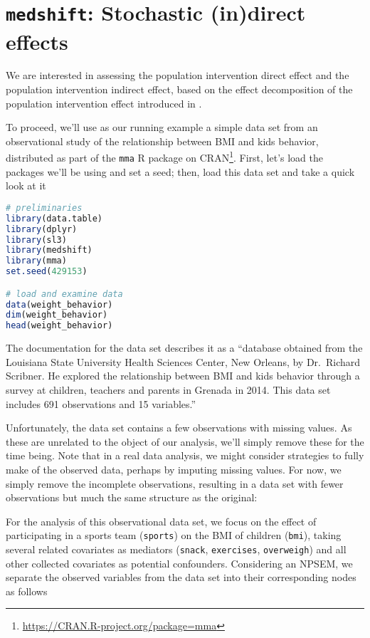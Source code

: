 \documentclass[
  12pt,
]{book}
\newcommand{\passthrough}[1]{#1}
\renewcommand{\href}[2]{#2\footnote{\url{#1}}}
\theoremstyle{definition}
\theoremstyle{definition}
\theoremstyle{definition}
\newcommand{\1}{\mathbbm{1}}
\begin{document}
\hypertarget{medshift-stochastic-indirect-effects}{%
\section{\texorpdfstring{\texttt{medshift}: Stochastic (in)direct effects}{medshift: Stochastic (in)direct effects}}\label{medshift-stochastic-indirect-effects}}

We are interested in assessing the population intervention direct effect and
the population intervention indirect effect, based on the effect decomposition
of the population intervention effect introduced in \citet{diaz2020causal}.

To proceed, we'll use as our running example a simple data set from an
observational study of the relationship between BMI and kids behavior,
distributed as part of the \href{https://CRAN.R-project.org/package=mma}{\passthrough{\lstinline!mma!} R package on
CRAN}. First, let's load the packages
we'll be using and set a seed; then, load this data set and take a quick look
at it

\begin{lstlisting}[language=R]
# preliminaries
library(data.table)
library(dplyr)
library(sl3)
library(medshift)
library(mma)
set.seed(429153)

# load and examine data
data(weight_behavior)
dim(weight_behavior)
head(weight_behavior)
\end{lstlisting}

The documentation for the data set describes it as a ``database obtained from the
Louisiana State University Health Sciences Center, New Orleans, by Dr.~Richard
Scribner. He explored the relationship between BMI and kids behavior through a
survey at children, teachers and parents in Grenada in 2014. This data set
includes 691 observations and 15 variables.''

Unfortunately, the data set contains a few observations with missing values. As
these are unrelated to the object of our analysis, we'll simply remove these for
the time being. Note that in a real data analysis, we might consider strategies
to fully make of the observed data, perhaps by imputing missing values. For now,
we simply remove the incomplete observations, resulting in a data set with fewer
observations but much the same structure as the original:

For the analysis of this observational data set, we focus on the effect of
participating in a sports team (\passthrough{\lstinline!sports!}) on the BMI of children (\passthrough{\lstinline!bmi!}), taking
several related covariates as mediators (\passthrough{\lstinline!snack!}, \passthrough{\lstinline!exercises!}, \passthrough{\lstinline!overweigh!}) and
all other collected covariates as potential confounders. Considering an NPSEM,
we separate the observed variables from the data set into their corresponding
nodes as follows
\end{document}
